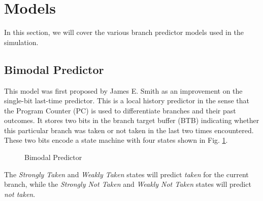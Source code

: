 \documentclass[conference]{IEEEtran}
\begin{document}
\section{Models} \label{sec:models}
In this section, we will cover the various branch predictor models used in the simulation.

\subsection{Bimodal Predictor} \label{ssec:bimodal}
This model was first proposed by James E. Smith as an improvement on the single-bit last-time predictor\cite{smith1981}. This is a local history predictor in the sense that the Program Counter (PC) is used to differentiate branches and their past outcomes. It stores two bits in the branch target buffer (BTB) indicating whether this particular branch was taken or not taken in the last two times encountered. These two bits encode a state machine with four states shown in Fig. 
\ref{fig:bimodal}. 
\begin{figure}
    \centering
    \caption{Bimodal Predictor}
	\label{fig:bimodal}
\end{figure}
The \textit{Strongly Taken} and \textit{Weakly Taken} states will predict \textit{taken} for the current branch, while the \textit{Strongly Not Taken} and \textit{Weakly Not Taken} states will predict \textit{not taken}.
\end{document}
